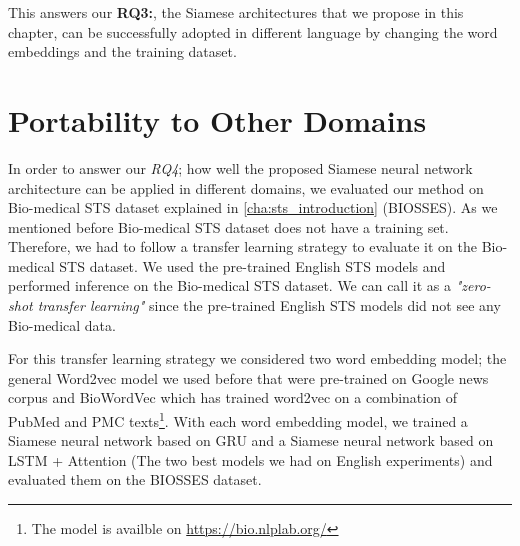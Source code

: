 This answers our \textbf{RQ3:}, the Siamese architectures that we propose in this chapter, can be successfully adopted in different language by changing the word embeddings and the training dataset.

\section{Portability to Other Domains}
\label{sec:siamese_domains}
In order to answer our \textit{RQ4}; how well the proposed Siamese neural network architecture can be applied in different domains, we evaluated our method on Bio-medical STS dataset explained in \ref{cha:sts_introduction} (BIOSSES). As we mentioned before Bio-medical STS dataset does not have a training set. Therefore, we had to follow a transfer learning strategy to evaluate it on the Bio-medical STS dataset. We used the pre-trained English STS models and performed inference on the Bio-medical STS dataset. We can call it as a \textit{"zero-shot transfer learning"} since the pre-trained English STS models did not see any Bio-medical data.

For this transfer learning strategy we considered two word embedding model; the general Word2vec model we used before \cite{DBLP:journals/corr/abs-1301-3781} that were pre-trained on Google news corpus and BioWordVec \cite{Zhang2019} which has trained word2vec on a combination of PubMed and PMC texts\footnote{The model is availble on \url{https://bio.nlplab.org/}}. With each word embedding model, we trained a Siamese neural network based on GRU and a Siamese neural network based on LSTM + Attention (The two best models we had on English experiments) and evaluated them on the BIOSSES dataset.


\begin{table}[htb]
	\centering
	\caption[Results for transfer learning with Siamese Neural Network in BIOSSES dataset]{Results for transfer learning with different variants of Siamese Neural Network in BIOSSES dataset. Two considered word embedding models are Word2vec and BioWordVec. We only report the Pearson correlation due to ease of visualisation.}  
	\label{tab:transfer_siamese_biosses}
\end{table}

